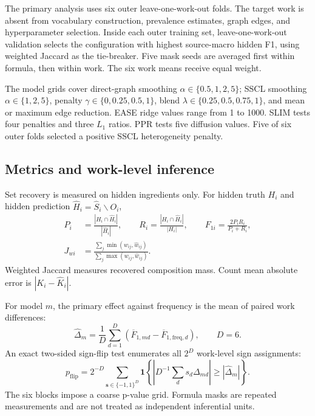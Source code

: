 \documentclass[11pt,a4paper]{article}
\newcommand{\SSCL}{\textsc{SSCL}}
\newcommand{\vect}[1]{\boldsymbol{#1}}
\begin{document}
The primary analysis uses six outer leave-one-work-out folds. The target work is absent from vocabulary construction, prevalence estimates, graph edges, and hyperparameter selection. Inside each outer training set, leave-one-work-out validation selects the configuration with highest source-macro hidden F1, using weighted Jaccard as the tie-breaker. Five mask seeds are averaged first within formula, then within work. The six work means receive equal weight.

The model grids cover direct-graph smoothing $\alpha\in\{0.5,1,2,5\}$; \SSCL{} smoothing $\alpha\in\{1,2,5\}$, penalty $\gamma\in\{0,0.25,0.5,1\}$, blend $\lambda\in\{0.25,0.5,0.75,1\}$, and mean or maximum edge reduction. EASE ridge values range from 1 to 1000. SLIM tests four penalties and three $L_1$ ratios. PPR tests five diffusion values. Five of six outer folds selected a positive \SSCL{} heterogeneity penalty.

\subsection{Metrics and work-level inference}

Set recovery is measured on hidden ingredients only. For hidden truth $H_i$ and hidden prediction $\widehat H_i=\widehat S_i\mathbin{\backslash}O_i$,
\begin{align}
P_i&=\frac{|H_i\cap\widehat H_i|}{|\widehat H_i|},\qquad
R_i=\frac{|H_i\cap\widehat H_i|}{|H_i|},\qquad
F_{1i}=\frac{2P_iR_i}{P_i+R_i},\\
J_{wi}&=\frac{\sum_j\min(w_{ij},\widehat w_{ij})}
{\sum_j\max(w_{ij},\widehat w_{ij})}.
\label{eq:metrics}
\end{align}
Weighted Jaccard measures recovered composition mass. Count mean absolute error is \(|K_i-\widehat K_i|\).

For model $m$, the primary effect against frequency is the mean of paired work differences:
\begin{equation}
\widehat\Delta_m=\frac{1}{D}\sum_{d=1}^{D}
\left(\overline F_{1,md}-\overline F_{1,\mathrm{freq},d}\right),\qquad D=6.
\label{eq:estimand}
\end{equation}
An exact two-sided sign-flip test enumerates all $2^D$ work-level sign assignments:
\begin{equation}
p_{\mathrm{flip}}=2^{-D}\sum_{\vect{s}\in\{-1,1\}^{D}}
\mathbf{1}\!\left\{
\left|D^{-1}\sum_d s_d\Delta_{md}\right|\ge|\widehat\Delta_m|
\right\}.
\label{eq:signflip}
\end{equation}
The six blocks impose a coarse p-value grid. Formula masks are repeated measurements and are not treated as independent inferential units.
\end{document}
